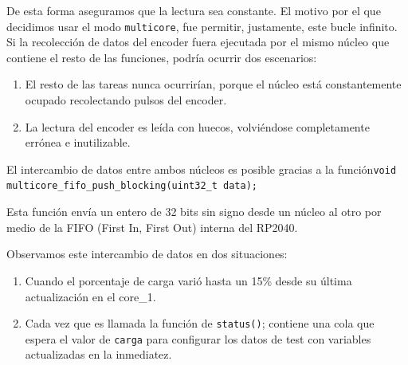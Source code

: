 \begin{itemize} [label = ·]
                    De esta forma aseguramos que la lectura sea constante. El motivo por el que decidimos usar el modo \texttt{multicore}, fue permitir, justamente, este bucle infinito. Si la recolección de datos del encoder fuera ejecutada por el mismo núcleo que contiene el resto de las funciones, podría ocurrir dos escenarios:\par
                    
                    \begin{enumerate}
                    \setlength{\itemindent}{1.5em}
                
                        \item El resto de las tareas nunca ocurrirían, porque el núcleo está constantemente ocupado recolectando pulsos del encoder.\par
                        \item La lectura del encoder es leída con huecos, volviéndose completamente errónea e inutilizable.
                        
                    \end{enumerate}
                     
                    El intercambio de datos entre ambos núcleos es posible gracias a la función\texttt{void multicore\_fifo\_push\_blocking(uint32\_t data);}\par
                    Esta función envía un entero de 32 bits sin signo desde un núcleo al otro por medio de la FIFO (First In, First Out) interna del RP2040.\par
                    Observamos este intercambio de datos en dos situaciones:\par
                    
                    \begin{enumerate}
                    \setlength{\itemindent}{1.5em}
                    
                        \item Cuando el porcentaje de carga varió hasta un 15\% desde su última actualización en el core\_1.\par
                    
                        \par
                    
                        \item Cada vez que es llamada la función de \texttt{status()}; contiene una cola que espera el valor de \texttt{carga} para configurar los datos de test con variables actualizadas en la inmediatez.\par
                        
                    \end{enumerate}

                \end{itemize}

